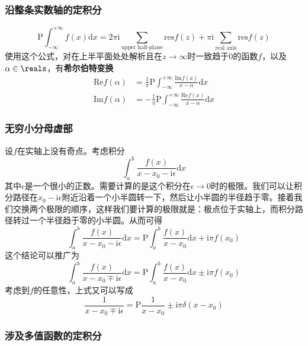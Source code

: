 \hypertarget{ux6cbfux6574ux6761ux5b9eux6570ux8f74ux7684ux5b9aux79efux5206}{%
\subsubsection{沿整条实数轴的定积分}\label{ux6cbfux6574ux6761ux5b9eux6570ux8f74ux7684ux5b9aux79efux5206}}

\[
\mathrm{P} \int_{-\infty}^{+\infty} f(x) \mathrm{d}x = 2 \pi  \mathrm{i} \sum_{\text{upper half-plane}} \mathrm{res} f(z) + \pi \mathrm{i} \sum_{\text{real axis}} \mathrm{res} f(z)
\]
使用这个公式，对在上半平面处处解析且在\(z \to \infty\)时一致趋于0的函数\(f\)，以及\(\alpha \in \reals\)，有\textbf{希尔伯特变换}
\[
\begin{aligned}
    \mathrm{Re} f(\alpha) &= \frac{1}{\pi} \mathrm{P} \int_{-\infty}^{+\infty} \frac{\mathrm{Im} f(x)}{x - \alpha} \mathrm{d} x \\
    \mathrm{Im} f(\alpha) &= - \frac{1}{\pi} \mathrm{P} \int_{-\infty}^{+\infty} \frac{\mathrm{Re} f(x)}{x - \alpha} \mathrm{d} x 
\end{aligned}
\]

\hypertarget{ux65e0ux7a77ux5c0fux5206ux6bcdux865aux90e8}{%
\subsubsection{无穷小分母虚部}\label{ux65e0ux7a77ux5c0fux5206ux6bcdux865aux90e8}}

设\(f\)在实轴上没有奇点。考虑积分 \[
\int_a^b \frac{f(x)}{x-x_0 - \mathrm{i}\epsilon} \mathrm{d}x
\]
其中\(\epsilon\)是一个很小的正数。需要计算的是这个积分在\(\epsilon\to 0\)时的极限。我们可以让积分路径在\(x_0 - \mathrm{i}\epsilon\)附近沿着一个小半圆转一下，然后让小半圆的半径趋于零。接着我们交换两个极限的顺序，这样我们要计算的极限就是：极点位于实轴上，而积分路径转过一个半径趋于零的小半圆。从而可得
\[
\int_a^b \frac{f(x)}{x-x_0 - \mathrm{i}\epsilon} \mathrm{d}x = \mathrm{P} \int_a^b \frac{f(x)}{x-x_0} \mathrm{d}x + \mathrm{i} \pi f(x_0)
\] 这个结论可以推广为 \[
\int_a^b \frac{f(x)}{x-x_0 \mp \mathrm{i}\epsilon} \mathrm{d}x = \mathrm{P} \int_a^b \frac{f(x)}{x-x_0} \mathrm{d}x \pm \mathrm{i} \pi f(x_0)
\] 考虑到\(f\)的任意性，上式又可以写成 \[
\frac{1}{x - x_0 \mp \mathrm{i}\epsilon} = \mathrm{P} \frac{1}{x - x_0} \pm \mathrm{i} \pi \delta(x - x_0)
\]

\hypertarget{ux6d89ux53caux591aux503cux51fdux6570ux7684ux5b9aux79efux5206}{%
\subsubsection{涉及多值函数的定积分}\label{ux6d89ux53caux591aux503cux51fdux6570ux7684ux5b9aux79efux5206}}

